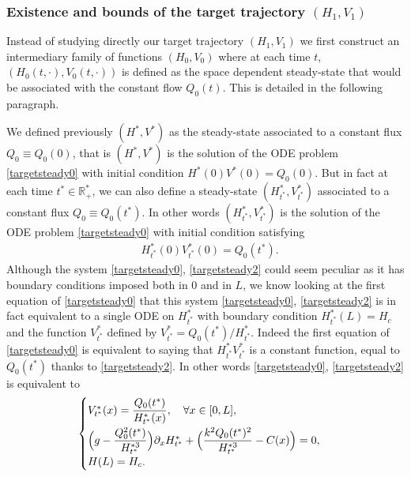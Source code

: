 \subsubsection*{Existence and bounds of the target trajectory $(H_{1},V_{1})$}

Instead of studying directly our target trajectory $(H_{1},V_{1})$ we first construct an intermediary family of functions
$(H_{0},V_{0})$ where at each time $t$, $(H_{0}(t,\cdot),V_{0}(t,\cdot))$ is defined as the space dependent steady-state that would be associated with the constant flow $Q_{0}(t)$. This is detailed in the following paragraph.

We defined previously $(H^{*}, V^{*})$ as the steady-state associated to a constant flux $Q_{0}\equiv Q_{0}(0)$, {that is} $(H^{*},V^{*})$ is the solution of the ODE problem \eqref{targetsteady0} with
initial condition $H^{*}(0)V^{*}(0)=Q_{0}(0)$. But in fact
at each time $t^{*}\in\mathbb{R}^{*}_{+}$, we can also define a steady-state $(H^{*}_{t^{*}},V^{*}_{t^{*}})$ associated to a constant flux $Q_{0}\equiv Q_{0}(t^{*})$. {In other words}
$(H^{*}_{t^{*}},V^{*}_{t^{*}})$ is the solution of the ODE problem \eqref{targetsteady0}
with initial condition satisfying
\begin{equation}
\begin{split}
&H_{t^{*}}^{*}(0)V_{t^{*}}^{*}(0)=Q_{0}(t^{*}).
\end{split}
\label{targetsteady2}
\end{equation}
Although the system \eqref{targetsteady0}, \eqref{targetsteady2} could seem peculiar as it has boundary conditions imposed both in $0$ and in $L$,
we know looking at the first equation of \eqref{targetsteady0} that this system \eqref{targetsteady0}, \eqref{targetsteady2} is in fact equivalent to a single ODE on $H_{t^{*}}^{*}$
with boundary condition $H_{t^{*}}^{*}(L)=H_{c}$ and the function $V_{t^{*}}^{*}$ defined by $V_{t^{*}}^{*}=Q_{0}(t^{*})/H_{t^{*}}^{*}$. Indeed the first equation of \eqref{targetsteady0} is equivalent to saying that $H_{t^{*}}^{*}V_{t^{*}}^{*}$ is a constant function, equal to $Q_{0}(t^{*})$ thanks to \eqref{targetsteady2}. In other words \eqref{targetsteady0}, \eqref{targetsteady2} is equivalent to
\begin{equation*}
\begin{cases}
V_{t^{*}}^{*}(x)=\dfrac{Q_{0}(t^{*})}{H_{t^{*}}^{*}(x)},\quad\forall x\in[0,L],\\[8pt]
\Bigl(g-\dfrac{Q_{0}^{2}(t^{*})}{H_{t^{*}}^{*3}} \Bigr)\partial_{x}H_{t^{*}}^{*}+ \Bigl(\dfrac{k^{2}Q_{0}(t^{*})^{2}}{H_{t^{*}}^{*3}}-C(x) \Bigr)=0,\\[5pt]
H(L)=H_{c}.
\end{cases}
\end{equation*}
